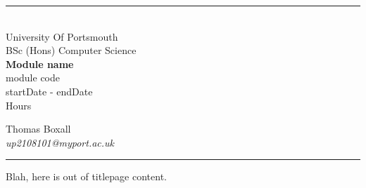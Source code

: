 \documentclass[a4paper, 11pt]{report}
\begin{document}
    \begin{titlepage}
        \rule{\textwidth}{1px}
        \vspace{0.025\textheight}\\
        \huge{University Of Portsmouth}\\
        \huge{BSc (Hons) Computer Science}\\
        \vfill
        \LARGE{\textbf{Module name}}\\
        \Large{module code}\\
        \large{startDate - endDate}\\
        \large{Hours}
        \vfill

        
        \begin{FlushRight}
            \large{Thomas Boxall}\\
            \textit{up2108101@myport.ac.uk}\\
            
        \end{FlushRight}
        \vspace{0.2\textheight}
        \rule{\textwidth}{1px}
        
    \end{titlepage}
    Blah, here is out of titlepage content.
\end{document}
